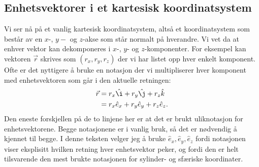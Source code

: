 \documentclass[a4paper,norsk,12pt]{book}
\def\ex{\ensuremath{\hat{e}_x}}
\def\ey{\ensuremath{\hat{e}_y}}
\def\ez{\ensuremath{\hat{e}_z}}
\begin{document}
\subsection{Enhetsvektorer i et kartesisk koordinatsystem}
Vi ser nå på et vanlig kartesisk koordinatsystem, altså et koordinatsystem som består av en $x$-, $y-$ og $z$-akse som står normalt på hverandre. Vi vet da at enhver vektor kan dekomponeres i $x$-, $y$- og $z$-komponenter. For eksempel kan vektoren $\vec{r}$ skrives som $(r_x, r_y, r_z)$ der vi har listet opp hver enkelt komponent. Ofte er det nyttigere å bruke en notasjon der vi multipliserer hver komponent med enhetsvektoren som går i den aktuelle retningen:
\begin{displaymath}
\begin{aligned}
	\vec{r} &= r_x\hat{\i} + r_y\hat{\j} + r_z\hat{k} \\
	&= r_x\ex + r_y\ey + r_z\ez.
\end{aligned}
\end{displaymath}
Den eneste forskjellen på de to linjene her er at det er brukt uliknotasjon for enhetsvektorene. Begge notasjonene er i vanlig bruk, så det er nødvendig å kjennet til begge. I denne teksten velger jeg å bruke $\ex, \ey, \ez$ fordi notasjonen viser eksplisitt hvilken retning hver enhetsvektor peker, og fordi den er helt tilsvarende den mest brukte notasjonen for sylinder- og sfæriske koordinater.
\end{document}

